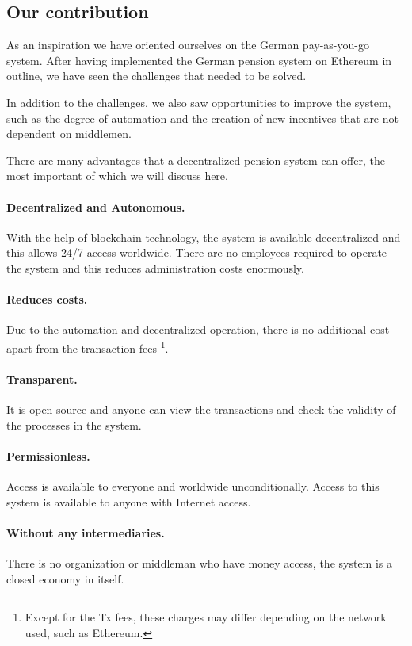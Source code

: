 \subsection{Our contribution}
As an inspiration we have oriented ourselves on the German pay-as-you-go system. After having implemented the German pension system on Ethereum in outline, we have seen the challenges that needed to be solved.

In addition to the challenges, we also saw opportunities to improve the system, such as the degree of automation and the creation of new incentives that are not dependent on middlemen.

There are many advantages that a decentralized pension system can offer, the most important of which we will discuss here.

\paragraph{Decentralized and Autonomous.} With the help of blockchain technology, the system is available decentralized and this allows 24/7 access worldwide. There are no employees required to operate the system and this reduces administration costs enormously.

\paragraph{Reduces costs.} Due to the automation and decentralized operation, there is no additional cost apart from the transaction fees \footnote{Except for the Tx fees, these charges may differ depending on the network used, such as Ethereum.}.

\paragraph{Transparent.} It is open-source and anyone can view the transactions and check the validity of the processes in the system.

\paragraph{Permissionless.} 
Access is available to everyone and worldwide unconditionally. Access to this system is available to anyone with Internet access.

\paragraph{Without any intermediaries.} 
There is no organization or middleman who have money access, the system is a closed economy in itself.


